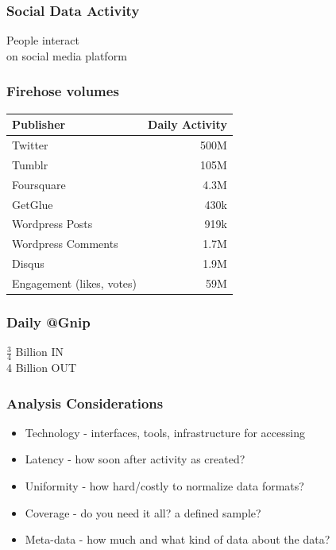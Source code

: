 \documentclass{beamer}
\begin{document}

\begin{frame}\frametitle{Social Data Activity}
\begin{center}
{\Huge People interact \\ [8pt] on social media platform}
\end{center}
\end{frame}


\begin{frame} \frametitle{Firehose volumes}
\begin{table}
\begin{tabular}{l|r}
\hline
   {Publisher}   &   {Daily Activity}   \\
\hline 
    Twitter      &      500M   \\
    Tumblr      &       105M   \\
    Foursquare &       4.3M \\
    GetGlue &         430k \\
    Wordpress Posts &     919k   \\
    Wordpress Comments & 1.7M \\
    Disqus       &       1.9M  \\
    Engagement (likes, votes) & 59M  \\
\hline
\end{tabular}
\end{table}
\end{frame}

%

\begin{frame}\frametitle{Daily @Gnip}
\begin{center}
{\Huge $\frac{3}{4}$ Billion IN \\ [18pt] 4 Billion OUT}
\end{center}
\end{frame}


\begin{frame}\frametitle{Analysis Considerations}
{\Large
\begin{itemize}
\item Technology - interfaces, tools, infrastructure for accessing
\item Latency - how soon after activity as created?
\item Uniformity - how hard/costly to normalize data formats?
\item Coverage - do you need it all? a defined sample?
\item Meta-data -  how much and what kind of data about the data?
\end{itemize}
}
\end{frame}
\end{document}

